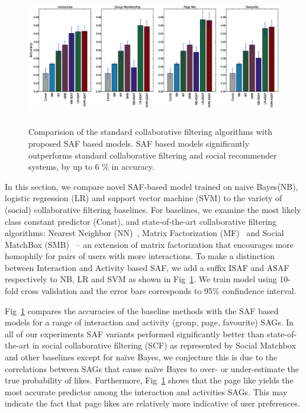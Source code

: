 \begin{figure}[tbp!]
\hspace{-6mm}\includegraphics[width=180mm,height=60mm]{data/plots/accuracy/accuracyLargeNew.eps}
\caption{  Comparision of the standard collaborative filtering algorithms with proposed SAF based models.  SAF based models significantly outperforms standard collaborative filtering and social recommender systems, by up to 6 \% in accuracy. }
\label{Fig1}
\end{figure}

In this section, we compare novel SAF-based model trained on naive Bayes(NB), 
logistic regression (LR) and support vector machine (SVM) to the variety of
(social) collaborative filtering baselines. For baselines, we examine the most 
likely class constant predictor (Const), and state-of-the-art collaborative 
filtering algorithms: Nearest Neighbor (NN)~\cite{bellkor}, Matrix Factorization (MF)~\cite{pmf} 
and Social MatchBox (SMB)~\cite{Noel2012NOF} -- an extension of matrix
factorization that encourages more homophily for pairs of users with
more interactions. To make a distinction between Interaction and Activity based SAF, 
we add a suffix ISAF and ASAF respectively to NB, LR and SVM as shown in Fig~\ref{Fig1}. We train model using
10-fold cross validation and the error bars corresponds to 95\% confindence interval.

Fig~\ref{Fig1} compares the accuracies of the baseline methods 
with the SAF based models for a range of interaction and activity (group,
page, favourite) SAGs.  In all of our experiments SAF variants
performed significantly better than state-of-the-art in social
collaborative filtering (SCF) as represented by Social
Matchbox~\cite{Noel2012NOF} and other baselines except for na\"{i}ve Bayes, 
we conjecture this is due to the correlations between SAGs that cause na\"{i}ve
Bayes to over- or under-estimate the true probability of likes. Furthermore, Fig~\ref{Fig1} 
shows that the page like yields the most accurate predictor among the interaction and activities SAGs.
This may indicate the fact that page likes are relatively more indicative of user preferences.

